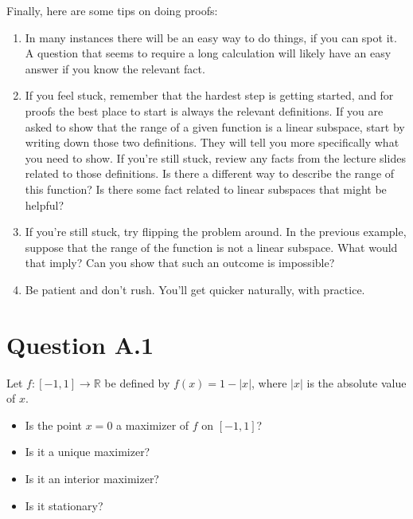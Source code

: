 \documentclass[letterpaper,10pt,english]{jupyterBook}
\begin{document}
\sphinxAtStartPar
Finally, here are some tips on doing proofs:
\begin{enumerate}
%
\item {} 
\sphinxAtStartPar
In many instances there will be an easy way to do things, if you can spot it. A question that seems to require a long calculation will likely have an easy answer if you know the relevant fact.

\item {} 
\sphinxAtStartPar
If you feel stuck, remember that the hardest step is getting started, and for proofs the best place to start is always the relevant deﬁnitions. If you are asked to show that the range of a given function is a linear subspace, start by writing down those two deﬁnitions. They will tell you more speciﬁcally what you need to show. If you’re still stuck, review any facts from the lecture slides related to those deﬁnitions. Is there a different way to describe the range of this function? Is there some fact related to linear subspaces that might be helpful?

\item {} 
\sphinxAtStartPar
If you’re still stuck, try ﬂipping the problem around. In the previous example, suppose that the range of the function is not a linear subspace. What would that imply? Can you show that such an outcome is impossible?

\item {} 
\sphinxAtStartPar
Be patient and don’t rush. You’ll get quicker naturally, with practice.

\end{enumerate}


\section{Question A.1}
\label{\detokenize{02.exercises:question-a-1}}
\sphinxAtStartPar
Let \(f \colon [-1, 1] \to \mathbb{R}\) be defined by \(f(x) = 1 - |x|\), where \(|x|\) is the absolute value of \(x\).
\begin{itemize}
\item {} 
\sphinxAtStartPar
Is the point \(x = 0\) a maximizer of \(f\) on \([-1, 1]\)?

\item {} 
\sphinxAtStartPar
Is it a unique maximizer?

\item {} 
\sphinxAtStartPar
Is it an interior maximizer?

\item {} 
\sphinxAtStartPar
Is it stationary?

\end{itemize}
\end{document}
